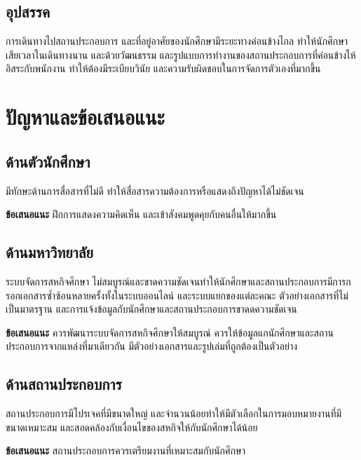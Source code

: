 \subsection{อุปสรรค}
การเดินทางไปสถานประกอบการ และที่อยู่อาศัยของนักศึกษามีระยะทางค่อนข้างไกล ทำให้นักศึกษาเสียเวลาในเดินทางนาน และด้วยวัฒนธรรม และรูปแบบการทำงานของสถานประกอบการที่ค่อนข้างให้อิสระกับพนักงาน ทำให้ต้องมีระเบียบวินัย และความรับผิดชอบในการจัดการตัวเองที่มากขึ้น

\section{ปัญหาและข้อเสนอแนะ}

\subsection{ด้านตัวนักศึกษา}
มีทักษะด้านการสื่อสารที่ไม่ดี ทำให้สื่อสารความต้องการหรือแสดงถึงปัญหาได้ไม่ชัดเจน

\textbf{ข้อเสนอแนะ} ฝึกการแสดงความคิดเห็น และเข้าสังคมพูดคุยกับคนอื่นให้มากขึ้น
\subsection{ด้านมหาวิทยาลัย}
ระบบจัดการสหกิจศึกษา ไม่สมบูรณ์และขาดความชัดเจนทำให้นักศึกษาและสถานประกอบการมีการกรอกเอกสารซ้ำซ้อนหลายครั้งทั้งในระบบออนไลน์ และระบบแยกของแต่ละคณะ ตัวอย่างเอกสารที่ไม่เป็นมาตรฐาน และการแจ้งข้อมูลกับนักศึกษาและสถานประกอบการขาดดความชัดเจน

\textbf{ข้อเสนอแนะ} ควรพัฒนาระบบจัดการสหกิจศึกษาให้สมบูรณ์ ควรให้ข้อมูลแกนักศึกษาและสถานประกอบการจากแหล่งที่มาเดียวกัน มีตัวอย่างเอกสารและรูปเล่มที่ถูกต้องเป็นตัวอย่าง
\subsection{ด้านสถานประกอบการ}
สถานประกอบการมีโปรเจคที่มีขนาดใหญ่ และจำนวนน้อยทำให้มีตัวเลือกในการมอบหมายงานที่มีขนาดเหมาะสม และสอดคล้องกับเงื่อนไขของสหกิจให้กับนักศึกษาได้น้อย

\textbf{ข้อเสนอแนะ} สถานประกอบการควรเตรียมงานที่เหมาะสมกับนักศึกษา